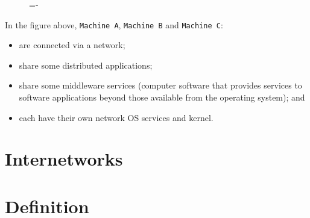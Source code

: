 \documentclass[a4paper]{systems-software}
\begin{document}
\begin{figure}[H]
	\lineskip=-\fboxrule
\end{figure}

In the figure above, \texttt{Machine A}, \texttt{Machine B} and \texttt{Machine C}:
\begin{itemize}
	\item are connected via a network;
	\item share some distributed applications;
	\item share some middleware services (computer software that provides services to software applications beyond those available from the operating system); and
	\item each have their own network OS services and kernel.
\end{itemize}


\section{Internetworks}

\section*{Definition}
\end{document}
